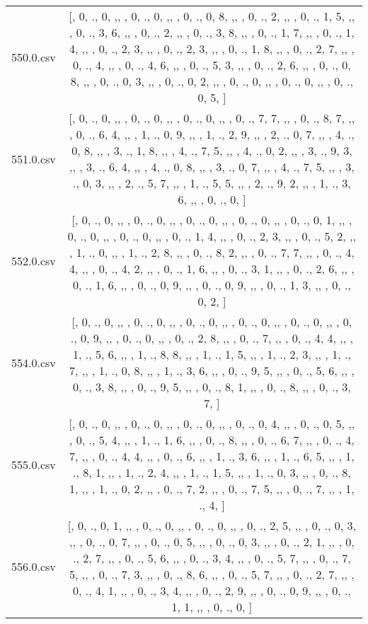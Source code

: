 \begin{table}[ht]
\begin{tabular}{@{}c c@{}}
	550.0.csv & [, 0, ., 0, ,,  , 0, ., 0, ,,  , 0, ., 0, 8, ,,  , 0, ., 2, ,,  , 0, ., 1, 5, ,,  , 0, ., 3, 6, ,,  , 0, ., 2, ,,  , 0, ., 3, 8, ,,  , 0, ., 1, 7, ,,  , 0, ., 1, 4, ,,  , 0, ., 2, 3, ,,  , 0, ., 2, 3, ,,  , 0, ., 1, 8, ,,  , 0, ., 2, 7, ,,  , 0, ., 4, ,,  , 0, ., 4, 6, ,,  , 0, ., 5, 3, ,,  , 0, ., 2, 6, ,,  , 0, ., 0, 8, ,,  , 0, ., 0, 3, ,,  , 0, ., 0, 2, ,,  , 0, ., 0, ,,  , 0, ., 0, ,,  , 0, ., 0, 5, ]\\ 
	551.0.csv & [, 0, ., 0, ,,  , 0, ., 0, ,,  , 0, ., 0, ,,  , 0, ., 7, 7, ,,  , 0, ., 8, 7, ,,  , 0, ., 6, 4, ,,  , 1, ., 0, 9, ,,  , 1, ., 2, 9, ,,  , 2, ., 0, 7, ,,  , 4, ., 0, 8, ,,  , 3, ., 1, 8, ,,  , 4, ., 7, 5, ,,  , 4, ., 0, 2, ,,  , 3, ., 9, 3, ,,  , 3, ., 6, 4, ,,  , 4, ., 0, 8, ,,  , 3, ., 0, 7, ,,  , 4, ., 7, 5, ,,  , 3, ., 0, 3, ,,  , 2, ., 5, 7, ,,  , 1, ., 5, 5, ,,  , 2, ., 9, 2, ,,  , 1, ., 3, 6, ,,  , 0, ., 0, ]\\ 
	552.0.csv & [, 0, ., 0, ,,  , 0, ., 0, ,,  , 0, ., 0, ,,  , 0, ., 0, ,,  , 0, ., 0, 1, ,,  , 0, ., 0, ,,  , 0, ., 0, ,,  , 0, ., 1, 4, ,,  , 0, ., 2, 3, ,,  , 0, ., 5, 2, ,,  , 1, ., 0, ,,  , 1, ., 2, 8, ,,  , 0, ., 8, 2, ,,  , 0, ., 7, 7, ,,  , 0, ., 4, 4, ,,  , 0, ., 4, 2, ,,  , 0, ., 1, 6, ,,  , 0, ., 3, 1, ,,  , 0, ., 2, 6, ,,  , 0, ., 1, 6, ,,  , 0, ., 0, 9, ,,  , 0, ., 0, 9, ,,  , 0, ., 1, 3, ,,  , 0, ., 0, 2, ]\\ 
	554.0.csv & [, 0, ., 0, ,,  , 0, ., 0, ,,  , 0, ., 0, ,,  , 0, ., 0, ,,  , 0, ., 0, ,,  , 0, ., 0, 9, ,,  , 0, ., 0, ,,  , 0, ., 2, 8, ,,  , 0, ., 7, ,,  , 0, ., 4, 4, ,,  , 1, ., 5, 6, ,,  , 1, ., 8, 8, ,,  , 1, ., 1, 5, ,,  , 1, ., 2, 3, ,,  , 1, ., 7, ,,  , 1, ., 0, 8, ,,  , 1, ., 3, 6, ,,  , 0, ., 9, 5, ,,  , 0, ., 5, 6, ,,  , 0, ., 3, 8, ,,  , 0, ., 9, 5, ,,  , 0, ., 8, 1, ,,  , 0, ., 8, ,,  , 0, ., 3, 7, ]\\ 
	555.0.csv & [, 0, ., 0, ,,  , 0, ., 0, ,,  , 0, ., 0, ,,  , 0, ., 0, 4, ,,  , 0, ., 0, 5, ,,  , 0, ., 5, 4, ,,  , 1, ., 1, 6, ,,  , 0, ., 8, ,,  , 0, ., 6, 7, ,,  , 0, ., 4, 7, ,,  , 0, ., 4, 4, ,,  , 0, ., 6, ,,  , 1, ., 3, 6, ,,  , 1, ., 6, 5, ,,  , 1, ., 8, 1, ,,  , 1, ., 2, 4, ,,  , 1, ., 1, 5, ,,  , 1, ., 0, 3, ,,  , 0, ., 8, 1, ,,  , 1, ., 0, 2, ,,  , 0, ., 7, 2, ,,  , 0, ., 7, 5, ,,  , 0, ., 7, ,,  , 1, ., 4, ]\\ 
	556.0.csv & [, 0, ., 0, 1, ,,  , 0, ., 0, ,,  , 0, ., 0, ,,  , 0, ., 2, 5, ,,  , 0, ., 0, 3, ,,  , 0, ., 0, 7, ,,  , 0, ., 0, 5, ,,  , 0, ., 0, 3, ,,  , 0, ., 2, 1, ,,  , 0, ., 2, 7, ,,  , 0, ., 5, 6, ,,  , 0, ., 3, 4, ,,  , 0, ., 5, 7, ,,  , 0, ., 7, 5, ,,  , 0, ., 7, 3, ,,  , 0, ., 8, 6, ,,  , 0, ., 5, 7, ,,  , 0, ., 2, 7, ,,  , 0, ., 4, 1, ,,  , 0, ., 3, 4, ,,  , 0, ., 2, 9, ,,  , 0, ., 0, 9, ,,  , 0, ., 1, 1, ,,  , 0, ., 0, ]\\ 

\end{tabular}
\end{table}
